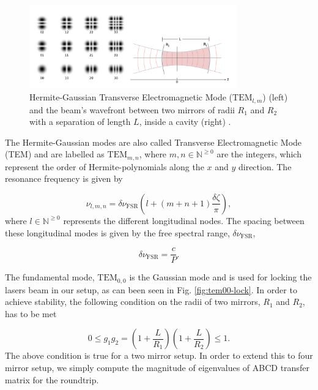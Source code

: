 \documentclass[a4paper]{report}
\numberwithin{equation}{section}
\begin{document}
\begin{figure}[htpb]
    \centering
    \includegraphics[width=0.8\textwidth]{hermite-gaussian}
	\caption{Hermite-Gaussian Transverse Electromagnetic Mode ($\mathrm{TEM}_{l, m}$) (left) and the beam's wavefront between two mirrors of radii $R_{1}$ and $R_{2}$ with a separation of length $L$, inside a cavity (right) \cite{Groh2021}. }
    \label{fig:hermite}
\end{figure}	

The Hermite-Gaussian modes are also called Transverse Electromagnetic Mode (TEM) and are labelled as $\mathrm{TEM}_{m,n}$, where $m, n \in \mathbb{N}^{\ge 0}$ are the integers, which represent the order of Hermite-polynomials along the $x$ and $y$ direction. The resonance frequency is given by

\begin{equation}
		\nu_{l, m, n} = \delta \nu_{\mathrm{FSR}}  \left(l + \left( m + n + 1 \right) \frac{\delta \zeta}{\pi  }\right) ,
\end{equation}
where $l \in \mathbb{N}^{\ge 0}$ represents the different longitudinal nodes. The spacing between these longitudinal modes is given by the free spectral range, $\delta \nu_{\mathrm{FSR}}$,

\begin{equation}
	\delta\nu_{\mathrm{FSR}} = \frac{c}{P} .
	\label{eq:fsr}
\end{equation}

The fundamental mode, $\mathrm{TEM}_{0, 0}$ is the Gaussian mode and is used for locking the lasers beam in our setup, as can been seen in Fig. \ref{fig:tem00-lock}. In order to achieve stability, the following condition on the radii of two mirrors, $R_{1}$ and $R_{2}$, has to be met

\begin{equation}
		0 \leq g_{1}g_{2} = \left(1 + \frac{L}{R_{1}} \right)\left(1 + \frac{L}{R_{2}} \right) \leq 1.
\end{equation}
The above condition is true for a two mirror setup. In order to extend this to four mirror setup, we simply compute the magnitude of eigenvalues of ABCD transfer matrix for the roundtrip. 
\end{document}
